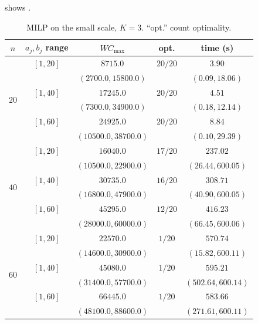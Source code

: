 \documentclass[12pt]{article}
\newlength{\resultstabwidth}
\newcommand{\resultstable}{%
    \centering
    \footnotesize
    \setlength{\tabcolsep}{4pt}%
    \renewcommand{\arraystretch}{1.15}}
\begin{document}
\begin{sloppypar}
 shows \TBD.

\begin{table}[H]
\resultstable
\caption{MILP on the small scale, $K=3$. ``opt.'' count optimality.}
\label{tab:results-small-milp-k3}
\begin{tabular*}{\resultstabwidth}{@{\extracolsep{\fill}}ccccc@{}}
\toprule
$n$ & $a_j,b_j$ range & $W C_{\max}$ & opt. & time (s) \\
\midrule
\multirow{6}{*}{$20$} & $[1,20]$ & $8715.0$ & $20/20$ & $3.90$ \\
                      &          & $(2700.0,15800.0)$ &       & $(0.09,18.06)$ \\
                      & $[1,40]$ & $17245.0$ & $20/20$ & $4.51$ \\
                      &          & $(7300.0,34900.0)$ &       & $(0.18,12.14)$ \\
                      & $[1,60]$ & $24925.0$ & $20/20$ & $8.84$ \\
                      &          & $(10500.0,38700.0)$ &       & $(0.10,29.39)$ \\
\midrule
\multirow{6}{*}{$40$} & $[1,20]$ & $16040.0$ & $17/20$ & $237.02$ \\
                      &          & $(10500.0,22900.0)$ &       & $(26.44,600.05)$ \\
                      & $[1,40]$ & $30735.0$ & $16/20$ & $308.71$ \\
                      &          & $(16800.0,47900.0)$ &       & $(40.90,600.05)$ \\
                      & $[1,60]$ & $45295.0$ & $12/20$ & $416.23$ \\
                      &          & $(28000.0,60000.0)$ &       & $(66.45,600.06)$ \\
\midrule
\multirow{6}{*}{$60$} & $[1,20]$ & $22570.0$ & $1/20$ & $570.74$ \\
                      &          & $(14600.0,30900.0)$ &       & $(15.82,600.11)$ \\
                      & $[1,40]$ & $45080.0$ & $1/20$ & $595.21$ \\
                      &          & $(31400.0,57700.0)$ &       & $(502.64,600.14)$ \\
                      & $[1,60]$ & $66445.0$ & $1/20$ & $583.66$ \\
                      &          & $(48100.0,88600.0)$ &       & $(271.61,600.11)$ \\
\bottomrule
\end{tabular*}
\end{table}


\end{sloppypar}
\end{document}
